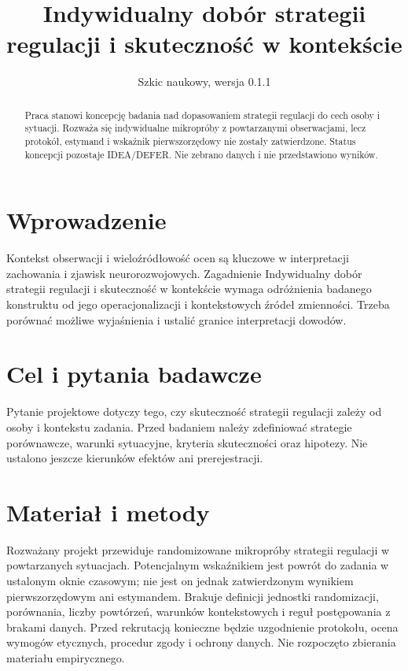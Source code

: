 \documentclass[11pt,a4paper]{article}
\title{Indywidualny dobór strategii regulacji i skuteczność w kontekście}
\author{}
\date{Szkic naukowy, wersja 0.1.1}
\begin{document}
\maketitle

\begin{abstract}

Praca stanowi koncepcję badania nad dopasowaniem strategii regulacji do cech osoby i sytuacji. Rozważa się indywidualne mikropróby z powtarzanymi obserwacjami, lecz protokół, estymand i wskaźnik pierwszorzędowy nie zostały zatwierdzone. Status koncepcji pozostaje IDEA/DEFER. Nie zebrano danych i nie przedstawiono wyników.

\end{abstract}

\section{Wprowadzenie}

Kontekst obserwacji i wieloźródłowość ocen są kluczowe w interpretacji zachowania i zjawisk neurorozwojowych. Zagadnienie Indywidualny dobór strategii regulacji i skuteczność w kontekście wymaga odróżnienia badanego konstruktu od jego operacjonalizacji i kontekstowych źródeł zmienności. Trzeba porównać możliwe wyjaśnienia i ustalić granice interpretacji dowodów.

\section{Cel i pytania badawcze}

Pytanie projektowe dotyczy tego, czy skuteczność strategii regulacji zależy od osoby i kontekstu zadania. Przed badaniem należy zdefiniować strategie porównawcze, warunki sytuacyjne, kryteria skuteczności oraz hipotezy. Nie ustalono jeszcze kierunków efektów ani prerejestracji.

\section{Materiał i metody}

Rozważany projekt przewiduje randomizowane mikropróby strategii regulacji w powtarzanych sytuacjach. Potencjalnym wskaźnikiem jest powrót do zadania w ustalonym oknie czasowym; nie jest on jednak zatwierdzonym wynikiem pierwszorzędowym ani estymandem. Brakuje definicji jednostki randomizacji, porównania, liczby powtórzeń, warunków kontekstowych i reguł postępowania z brakami danych. Przed rekrutacją konieczne będzie uzgodnienie protokołu, ocena wymogów etycznych, procedur zgody i ochrony danych. Nie rozpoczęto zbierania materiału empirycznego.
\end{document}
